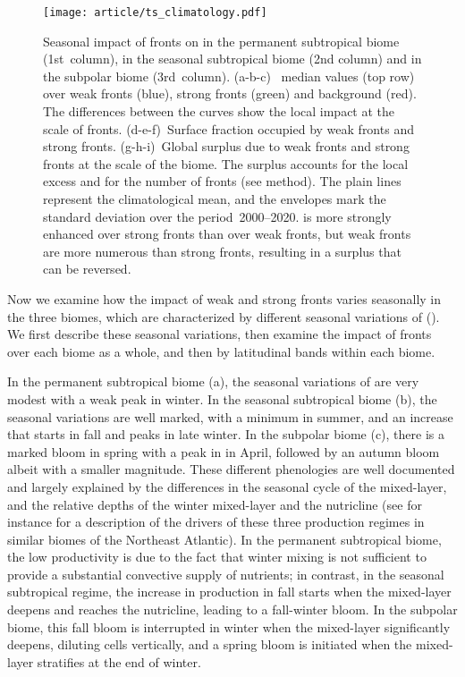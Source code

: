 \begin{figure}
  \centering
  \texttt{[image: article/ts\_climatology.pdf]}
  \caption[Seasonal impact of fronts on ]{
    Seasonal impact of fronts on  in the permanent subtropical biome (1st~column), in the seasonal subtropical biome (2nd column) and in the subpolar biome (3rd~column).
    (a-b-c)~ median values (top row) over weak fronts (blue), strong fronts (green) and background (red).
    The differences between the curves show the local impact at the scale of fronts.
    (d-e-f)~Surface fraction occupied by weak fronts and strong fronts.
    (g-h-i)~Global  surplus due to weak fronts and strong fronts at the scale of the biome.
    The surplus accounts for the local excess and for the number of fronts (see method).
    The plain lines represent the climatological mean, and the envelopes mark the standard deviation over the period~2000--2020.
     is more strongly enhanced over strong fronts than over weak fronts, but weak fronts are more numerous than strong fronts, resulting in a  surplus that can be reversed.
  }%
  \label{fig:ts-climato}
\end{figure}

Now we examine how the impact of weak and strong fronts varies seasonally in the three biomes, which are characterized by different seasonal variations of  ().
We first describe these seasonal variations, then examine the impact of fronts over each biome as a whole, and then by latitudinal bands within each biome.

In the permanent subtropical biome (a), the seasonal variations of  are very modest with a weak peak in winter.
In the seasonal subtropical biome (b), the seasonal variations are well marked, with a minimum in summer, and an increase that starts in fall and peaks in late winter.
In the subpolar biome (c), there is a marked bloom in spring with a peak in  in April, followed by an autumn bloom albeit with a smaller magnitude.
These different phenologies are well documented and largely explained by the differences in the seasonal cycle of the mixed-layer, and the relative depths of the winter mixed-layer and the nutricline (see for instance \textcite{levy_2005a} for a description of the drivers of these three production regimes in similar biomes of the Northeast Atlantic).
In the permanent subtropical biome, the low productivity is due to the fact that winter mixing is not sufficient to provide a substantial convective supply of nutrients; in contrast, in the seasonal subtropical regime, the increase in production in fall starts when the mixed-layer deepens and reaches the nutricline, leading to a fall-winter bloom.
In the subpolar biome, this fall bloom is interrupted in winter when the mixed-layer significantly deepens, diluting cells vertically, and a spring bloom is initiated when the mixed-layer stratifies at the end of winter.

